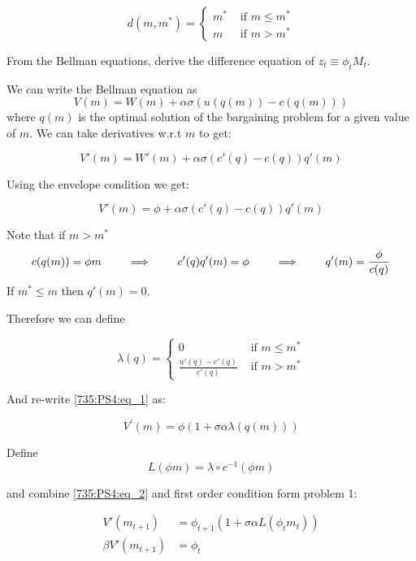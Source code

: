 \documentclass[12pt]{amsart}
\begin{document}
{{\begin{answer}
$$
\boxed{
d(m, m^*) = \left\{
\begin{array}{cc}
    m^* &  \text{ if } m\leq m^* \\
    m & \text{ if } m>m^*
\end{array}
\right.
}
$$
\end{answer}

\begin{subexercise}
From the Bellman equations, derive the difference equation of $z_{t} \equiv \phi_{t} M_{t}$.
\end{subexercise}

\begin{answer}
We can write the Bellman equation as
$$V(m) = W(m) + \alpha\sigma (u(q(m)) - c(q(m)))$$
where $q(m)$ is the optimal solution of the bargaining problem for a given value of $m$. We can take derivatives w.r.t $m$ to get:

$$V'(m) = W'(m) + \alpha\sigma (c'(q) - c(q))q'(m)$$

Using the envelope condition we get:

\begin{equation}\label{735:PS4:eq_1}
V'(m) = \phi + \alpha\sigma (c'(q) - c(q))q'(m)
\end{equation}

Note that  if $m>m^*$
\begin{align*}
    c(q(m)) = \phi m \qquad \implies \qquad c'(q)q'(m) = \phi \qquad \implies \qquad q'(m) = \frac{\phi}{c(q)}
\end{align*}
If $m^* \leq m$ then $q'(m) = 0$.

Therefore we can define 

$$
\lambda(q) = \left\{
\begin{array}{cc}
    0 &  \text{ if } m\leq m^* \\
    \frac{u'(q) - c'(q)}{c'(q)} & \text{ if } m>m^*
\end{array}
\right.
$$

And re-write \eqref{735:PS4:eq_1} as:

\begin{equation}\label{735:PS4:eq_2}
V^{\prime}(m)=\phi(1 + \sigma \alpha \lambda(q(m)))
\end{equation}

Define $$L(\phi m) = \lambda \circ c^{-1}(\phi m)$$

and combine \eqref{735:PS4:eq_2} and first order condition form problem 1:

\begin{align*}
    V'(m_{t+1}) &= \phi_{t+1}(1+\sigma \alpha L(\phi_t m_t))\\
    \beta V'(m_{t+1}) &= \phi_t
\end{align*}


\end{answer}}}
\end{document}

